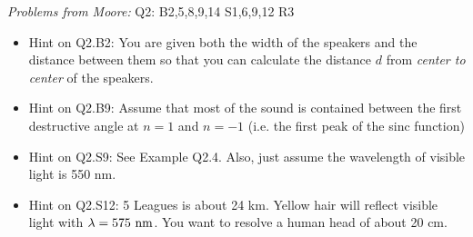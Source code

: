 \documentclass[12pt]{article}
\begin{document}
\vskip 0.5cm

\noindent
{\em Problems from Moore:} Q2: B2,5,8,9,14 S1,6,9,12 {R3}

\begin{itemize}

\item Hint on Q2.B2:  You are given both the width of the speakers and the distance between them so that you can calculate the distance $d$ from {\em center to center} of the speakers.

\item Hint on Q2.B9:  Assume that most of the sound is contained between the first destructive angle at $n=1$ and $n=-1$ (i.e. the first peak of the sinc function)

\item Hint on Q2.S9:  See Example Q2.4.  Also, just assume the wavelength of visible light is 550 nm.

\item Hint on Q2.S12:  5 Leagues is about 24 km.  Yellow hair will reflect visible light with $\lambda=575~{\rm nm}$.  You want to resolve a human head of about 20 cm.

\end{itemize}
\end{document}
